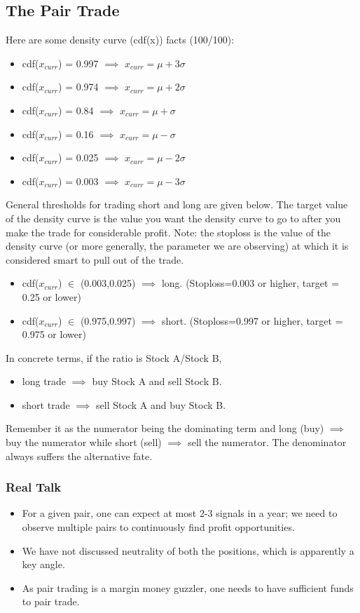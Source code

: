 \documentclass{article}
\begin{document}
\subsection{The Pair Trade}
Here are some density curve (cdf(x)) facts (100/100):
\begin{itemize}
    \item cdf($x_{curr}$) = 0.997 $\implies$ $x_{curr} = \mu+3\sigma$
    \item cdf($x_{curr}$) = 0.974 $\implies$ $x_{curr} = \mu+2\sigma$
    \item cdf($x_{curr}$) = 0.84 $\implies$ $x_{curr} = \mu+\sigma$
    \item cdf($x_{curr}$) = 0.16 $\implies$ $x_{curr} = \mu-\sigma$
    \item cdf($x_{curr}$) = 0.025 $\implies$ $x_{curr} = \mu-2\sigma$
    \item cdf($x_{curr}$) = 0.003 $\implies$ $x_{curr} = \mu-3\sigma$
\end{itemize}
General thresholds for trading short and long are given below. The target
value of the density curve is the value you want the density curve to go to
after you make the trade for considerable profit. Note: the stoploss is the
value of the density curve (or more generally, the parameter we are observing)
at which it is considered smart to pull out of the trade.
\begin{itemize}
    \item cdf($x_{curr}$) $\in$ (0.003,0.025) $\implies$ long.
    (Stoploss=0.003 or higher, target = 0.25 or lower)
    \item cdf($x_{curr}$) $\in$ (0.975,0.997) $\implies$ short.
    (Stoploss=0.997 or higher, target = 0.975 or lower)
\end{itemize}
In concrete terms, if the ratio is Stock A/Stock B,
\begin{itemize}
    \item long trade $\implies$ buy Stock A and sell Stock B.
    \item short trade $\implies$ sell Stock A and buy Stock B.
\end{itemize}
Remember it as the numerator being the dominating term and long (buy) $\implies$
buy the numerator while short (sell) $\implies$ sell the numerator. The
denominator always suffers the alternative fate.
\subsubsection{Real Talk}
\begin{itemize}
    \item For a given pair, one can expect at most 2-3 signals in a year; we need to observe multiple pairs to continuously find profit opportunities.
    \item We have not discussed neutrality of both the positions, which is apparently a key angle.
    \item As pair trading is a margin money guzzler, one needs to have sufficient funds to pair trade.
\end{itemize}
\end{document}
